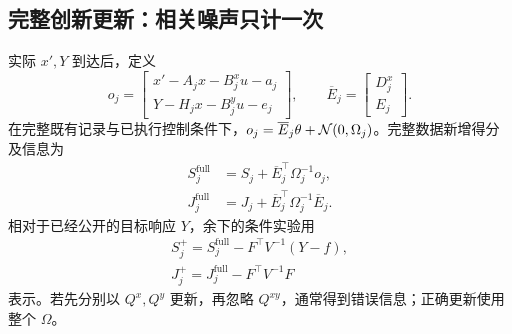 \documentclass[UTF8,fontset=fandol,zihao=5,a4paper]{ctexart}
\newcommand{\E}{\mathbb E}\newcommand{\Pp}{\mathbb P}
\theoremstyle{definition}
\theoremstyle{remark}\newtheorem{remark}[theorem]{说明}
\numberwithin{equation}{section}
\begin{document}
\subsection{完整创新更新：相关噪声只计一次}
实际 $x',Y$ 到达后，定义
\begin{equation}
o_j=\begin{bmatrix}
x'-A_jx-B_j^xu-a_j\\Y-H_jx-B_j^yu-e_j
\end{bmatrix},\qquad
\overline E_j=\begin{bmatrix}D_j^x\\E_j\end{bmatrix}.
\end{equation}
在完整既有记录与已执行控制条件下，$o_j=\overline E_j\theta+\mathcal N(0,\Omega_j)$。完整数据新增得分及信息为
\begin{align}
S_j^{\mathrm{full}}&=S_j+\overline E_j^\top\Omega_j^{-1}o_j,\\
J_j^{\mathrm{full}}&=J_j+\overline E_j^\top\Omega_j^{-1}\overline E_j.
\end{align}
相对于已经公开的目标响应 $Y$，余下的条件实验用
\begin{align}
\boxed{S_j^+=S_j^{\mathrm{full}}-F^\top V^{-1}(Y-f),}\label{eq:stateSupdate}\\
\boxed{J_j^+=J_j^{\mathrm{full}}-F^\top V^{-1}F}\label{eq:stateJupdate}
\end{align}
表示。若先分别以 $Q^x,Q^y$ 更新，再忽略 $Q^{xy}$，通常得到错误信息；正确更新使用整个 $\Omega$。
\end{document}
